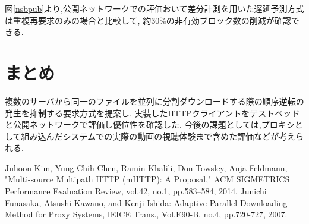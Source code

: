 \documentclass{ltjsarticle}
\begin{document}
図\ref{nsbpub}より,公開ネットワークでの評価おいて差分計測を用いた遅延予測方式は重複再要求のみの場合と比較して,
約30\%の非有効ブロック数の削減が確認できる.
\vspace{-8mm}
\section{まとめ}
\vspace{-2mm}
複数のサーバから同一のファイルを並列に分割ダウンロードする際の順序逆転の発生を抑制する要求方式を提案し,
実装したHTTPクライアントをテストベッドと公開ネットワークで評価し優位性を確認した.
今後の課題としては,プロキシとして組み込んだシステムでの実際の動画の視聴体験まで含めた評価などが考えられる.
\vspace{-7mm}
\footnotesize{
\begin{thebibliography}{2}
\vspace{-2mm}
Juhoon Kim, Yung-Chih Chen, Ramin Khalili, Don Towsley, Anja Feldmann,
"Multi-source Multipath HTTP (mHTTP): A Proposal,"
ACM SIGMETRICS Performance Evaluation Review, vol.42, no.1, pp.583--584, 2014.
Junichi Funasaka, Atsushi Kawano, and Kenji Ishida: Adaptive Parallel Downloading Method for Proxy Systems, IEICE Trans., Vol.E90-B, no.4, pp.720-727, 2007.
\end{thebibliography}}
\end{document}
